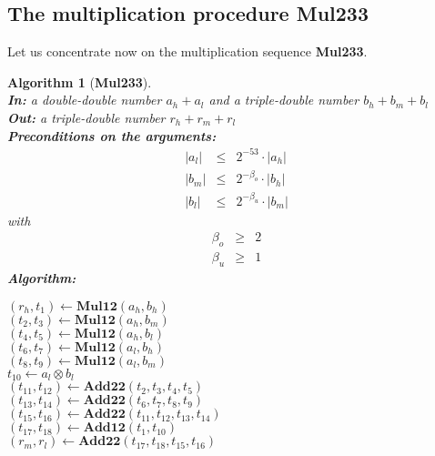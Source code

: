 \documentclass[a4paper,10pt,twoside]{article}
\newtheorem{algorithm}[theorem]{Algorithm}
\newcommand{\hi}{\ensuremath{\mathit{h}}}
\newcommand{\mi}{\ensuremath{\mathit{m}}}
\newcommand{\lo}{\ensuremath{\mathit{l}}}
\newcommand{\MulDTT}{{\bf Mul233}}
\newcommand{\mAdd}{\ensuremath{\mathbf{Add12}}}
\newcommand{\mAddDD}{\ensuremath{\mathbf{Add22}}}
\newcommand{\mMul}{\ensuremath{\mathbf{Mul12}}}
\begin{document}
\subsection{The multiplication procedure \MulDTT}
Let us concentrate now on the multiplication sequence \MulDTT. 
\begin{algorithm}[\MulDTT] \label{mulDTTref} ~ \\
{\bf In:} a double-double number $a_\hi + a_\lo$  and a triple-double number $b_\hi + b_\mi + b_\lo$ \\
{\bf Out:} a triple-double number $r_\hi + r_\mi + r_\lo$ \\
{\bf Preconditions on the arguments:}
\begin{eqnarray*}
\left \vert a_\lo \right \vert & \leq & 2^{-53} \cdot \left \vert a_\hi \right \vert \\
\left \vert b_\mi \right \vert & \leq & 2^{-\beta_o} \cdot \left \vert b_\hi \right \vert \\
\left \vert b_\lo \right \vert & \leq & 2^{-\beta_u} \cdot \left \vert b_\mi \right \vert 
\end{eqnarray*}
with
\begin{eqnarray*}
\beta_o & \geq & 2 \\
\beta_u & \geq & 1 
\end{eqnarray*}
{\bf Algorithm:} \\
\begin{center}
\begin{minipage}[b]{60mm}
$\left( r_\hi, t_1 \right) \gets \mMul\left( a_\hi, b_\hi \right)$ \\
$\left( t_2, t_3 \right) \gets \mMul\left( a_\hi, b_\mi \right)$ \\
$\left( t_4, t_5 \right) \gets \mMul\left( a_\hi, b_\lo \right)$ \\
$\left( t_6, t_7 \right) \gets \mMul\left( a_\lo, b_\hi \right)$ \\
$\left( t_8, t_9 \right) \gets \mMul\left( a_\lo, b_\mi \right)$ \\
$t_{10} \gets a_\lo \otimes b_\lo$ \\
$\left( t_{11}, t_{12} \right) \gets \mAddDD\left( t_2, t_3, t_4, t_5 \right)$ \\
$\left( t_{13}, t_{14} \right) \gets \mAddDD\left( t_6, t_7, t_8, t_9 \right)$ \\
$\left( t_{15}, t_{16} \right) \gets \mAddDD\left( t_{11}, t_{12}, t_{13}, t_{14} \right)$ \\
$\left( t_{17}, t_{18} \right) \gets \mAdd\left( t_1, t_{10} \right)$ \\
$\left( r_\mi, r_\lo \right) \gets \mAddDD\left( t_{17}, t_{18}, t_{15}, t_{16} \right)$ \\
\end{minipage}
\end{center}
\end{algorithm}
\end{document}
